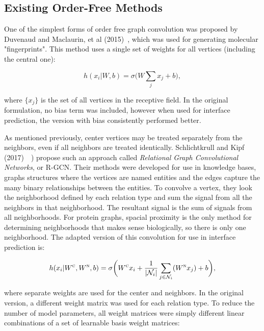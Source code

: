 \subsection{Existing Order-Free Methods}
One of the simplest forms of order free graph convolution was proposed by Duvenaud and Maclaurin, et al (2015)~\cite{duvenaud2015}, which was used for generating molecular "fingerprints".
This method uses a single set of weights for all vertices (including the central one):

\begin{equation}
h(x_i | W, b)= \sigma \bigg( W \sum_{j}x_j + b\bigg),
\label{eq:fingerprint}
\end{equation}

\noindent
where $\{x_j\}$ is the set of all vertices in the receptive field.
In the original formulation, no bias term was included, however when used for interface prediction, the version with bias consistently performed better.

As mentioned previously, center vertices may be treated separately from the neighbors, even if all neighbors are treated identically. 
Schlichtkrull and Kipf (2017)~~\cite{schlichtkrull2017}) propose such an approach called \emph{Relational Graph Convolutional Networks}, or R-GCN.
Their methods were developed for use in knowledge bases, graphs structures where the vertices are named entities and the edges capture the many binary relationships between the entities. 
To convolve a vertex, they look the neighborhood defined by each relation type and sum the signal from all the neighbors in that neighborhood.
The resultant signal is the sum of signals from all neighborhoods.
For protein graphs, spacial proximity is the only method for determining neighborhoods that makes sense biologically, so there is only one neighborhood.
The adapted version of this convolution for use in interface prediction is:

\begin{equation}
h(x_i | W^\textsc{c}, W^\textsc{n}, b)= \sigma \bigg( W^\textsc{c} x_i + \frac{1}{|\mathcal{N}_i|} \sum_{j \in \mathcal{N}_i}(W^\textsc{n} x_j)  + b\bigg),
\label{eq:rgcn}
\end{equation}

\noindent
where separate weights are used for the center and neighbors. 
In the original version, a different weight matrix was used for each relation type.  
To reduce the number of model parameters, all weight matrices were simply different linear combinations of a set of learnable basis weight matrices:

